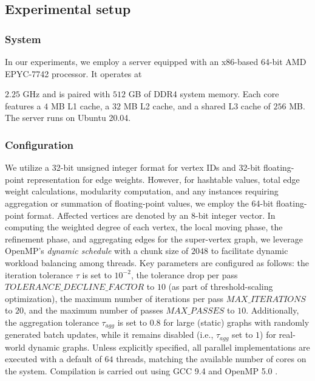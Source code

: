 \subsection{Experimental setup}
\label{sec:setup}

\subsubsection{System}
\label{sec:system}

In our experiments, we employ a server equipped with an x86-based 64-bit AMD EPYC-7742 processor. It operates at $2.25$ GHz and is paired with $512$ GB of DDR4 system memory. Each core features a $4$ MB L1 cache, a $32$ MB L2 cache, and a shared L3 cache of $256$ MB. The server runs on Ubuntu 20.04.


\subsubsection{Configuration}
\label{sec:configuration}

We utilize a 32-bit unsigned integer format for vertex IDs and 32-bit floating-point representation for edge weights. However, for hashtable values, total edge weight calculations, modularity computation, and any instances requiring aggregation or summation of floating-point values, we employ the 64-bit floating-point format. Affected vertices are denoted by an 8-bit integer vector. In computing the weighted degree of each vertex, the local moving phase, the refinement phase, and aggregating edges for the super-vertex graph, we leverage OpenMP's \textit{dynamic schedule} with a chunk size of $2048$ to facilitate dynamic workload balancing among threads. Key parameters are configured as follows: the iteration tolerance $\tau$ is set to $10^{-2}$, the tolerance drop per pass $TOLERANCE\_DECLINE\_FACTOR$ to $10$ (as part of threshold-scaling optimization), the maximum number of iterations per pass $MAX\_ITERATIONS$ to $20$, and the maximum number of passes $MAX\_PASSES$ to $10$. Additionally, the aggregation tolerance $\tau_{agg}$ is set to $0.8$ for large (static) graphs with randomly generated batch updates, while it remains disabled (i.e., $\tau_{agg}$ set to $1$) for real-world dynamic graphs. Unless explicitly specified, all parallel implementations are executed with a default of $64$ threads, matching the available number of cores on the system. Compilation is carried out using GCC 9.4 and OpenMP 5.0 \cite{openmp18}.


